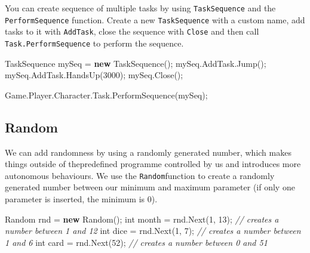 \documentclass[
  openany]{book}
\newenvironment{Shaded}{\begin{snugshade}}{\end{snugshade}}
\newcommand{\CommentTok}[1]{\textcolor[rgb]{0.56,0.35,0.01}{\textit{#1}}}
\newcommand{\DataTypeTok}[1]{\textcolor[rgb]{0.13,0.29,0.53}{#1}}
\newcommand{\DecValTok}[1]{\textcolor[rgb]{0.00,0.00,0.81}{#1}}
\newcommand{\FunctionTok}[1]{\textcolor[rgb]{0.00,0.00,0.00}{#1}}
\newcommand{\KeywordTok}[1]{\textcolor[rgb]{0.13,0.29,0.53}{\textbf{#1}}}
\newcommand{\NormalTok}[1]{#1}
\begin{document}
You can create sequence of multiple tasks by using \texttt{TaskSequence} and the \texttt{PerformSequence} function.
Create a new \texttt{TaskSequence} with a custom name, add tasks to it with \texttt{AddTask}, close the sequence with \texttt{Close} and then call \texttt{Task.PerformSequence} to perform the sequence.

\begin{Shaded}
\begin{Highlighting}[]
\NormalTok{TaskSequence mySeq = }\KeywordTok{new} \FunctionTok{TaskSequence}\NormalTok{();}
\NormalTok{mySeq.}\FunctionTok{AddTask}\NormalTok{.}\FunctionTok{Jump}\NormalTok{();}
\NormalTok{mySeq.}\FunctionTok{AddTask}\NormalTok{.}\FunctionTok{HandsUp}\NormalTok{(}\DecValTok{3000}\NormalTok{);}
\NormalTok{mySeq.}\FunctionTok{Close}\NormalTok{();}
                
\NormalTok{Game.}\FunctionTok{Player}\NormalTok{.}\FunctionTok{Character}\NormalTok{.}\FunctionTok{Task}\NormalTok{.}\FunctionTok{PerformSequence}\NormalTok{(mySeq);}
\end{Highlighting}
\end{Shaded}

\hypertarget{random}{%
\subsection*{Random}\label{random}}

We can add randomness by using a randomly generated number, which makes things outside of thepredefined programme controlled by us and introduces more autonomous behaviours. We use the \texttt{Random}function to create a randomly generated number between our minimum and maximum parameter (if only one parameter is inserted, the minimum is 0).

\begin{Shaded}
\begin{Highlighting}[]
\NormalTok{Random rnd = }\KeywordTok{new} \FunctionTok{Random}\NormalTok{(); }
\DataTypeTok{int}\NormalTok{ month = rnd.}\FunctionTok{Next}\NormalTok{(}\DecValTok{1}\NormalTok{, }\DecValTok{13}\NormalTok{); }\CommentTok{// creates a number between 1 and 12 }
\DataTypeTok{int}\NormalTok{ dice = rnd.}\FunctionTok{Next}\NormalTok{(}\DecValTok{1}\NormalTok{, }\DecValTok{7}\NormalTok{); }\CommentTok{// creates a number between 1 and 6 }
\DataTypeTok{int}\NormalTok{ card = rnd.}\FunctionTok{Next}\NormalTok{(}\DecValTok{52}\NormalTok{); }\CommentTok{// creates a number between 0 and 51}
\end{Highlighting}
\end{Shaded}
\end{document}
